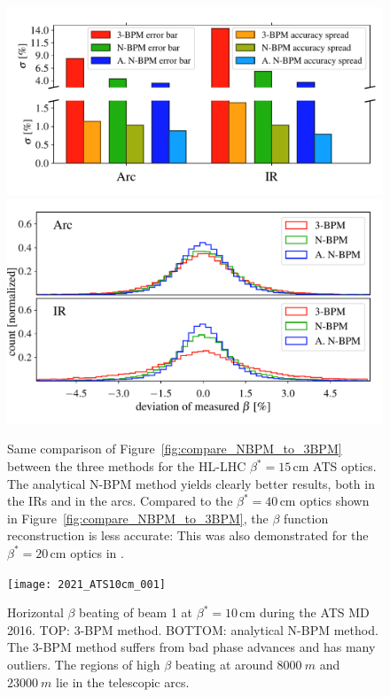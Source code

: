 \begin{figure}
	\centering
    \includegraphics[width=.7\linewidth]{comparison_statistics_HL007_bars}
    \\
    \includegraphics[width=.7\linewidth]{comparison_statistics_HL006}
	
	\caption{
        Same comparison of Figure~\ref{fig:compare_NBPM_to_3BPM} between the three methods for the
        HL-LHC $ \beta^*= 15\,\text{cm} $ ATS optics. The analytical N-BPM method yields clearly
        better results, both in the IRs and in the arcs. Compared to the $ \beta^*=40\,\text{cm} $
        optics shown in Figure~\ref{fig:compare_NBPM_to_3BPM}, the $ \beta $ function reconstruction
        is less accurate: This was also demonstrated for the $ \beta^*=20\,\text{cm} $ optics in
        \cite{LangnerNBPM}. }
	\label{fig:compare_ATS}
\end{figure}
%
\begin{figure}
	\centering
    \texttt{[image: 2021\_ATS10cm\_001]}
	\caption{Horizontal $ \beta $ beating of beam 1 at $ \beta^*=10\,\text{cm} $ during the ATS MD 2016. TOP: 3-BPM method. BOTTOM: analytical N-BPM method. The 3-BPM method suffers from bad phase advances and has many outliers. The regions of high $ \beta $ beating at around $ \SI{8000}{m} $ and $ \SI{23000}{m} $ lie in the telescopic arcs. }
	\label{fig:10cm_beam1_hor_3bpm}
\end{figure}
%
